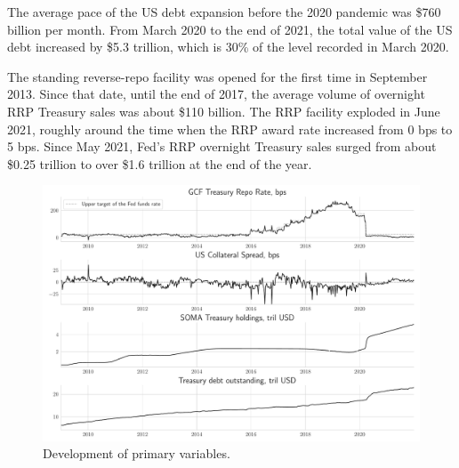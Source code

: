\documentclass[11pt,a4paper,english,oneside]{article}
\begin{document}
The average pace of the US debt expansion before the 2020 pandemic was \$760 billion per month. From March 2020 to the end of 2021, the total value of the US debt increased by \$5.3 trillion, which is 30\% of the level recorded in March 2020.

The standing reverse-repo facility was opened for the first time in September 2013. Since that date, until the end of 2017, the average volume of overnight RRP Treasury sales was about \$110 billion. The RRP facility exploded in June 2021, roughly around the time when the RRP award rate increased from 0 bps to 5 bps. Since May 2021, Fed's RRP overnight Treasury sales surged from about \$0.25 trillion to over \$1.6 trillion at the end of the year.

\begin{figure}[htb!]
  \begin{center}
    \caption{Development of primary variables.}
    \includegraphics[width=0.99\linewidth]{main_vars.pdf}
  \end{center}
  \label{fig:vars}
\end{figure}
\end{document}
